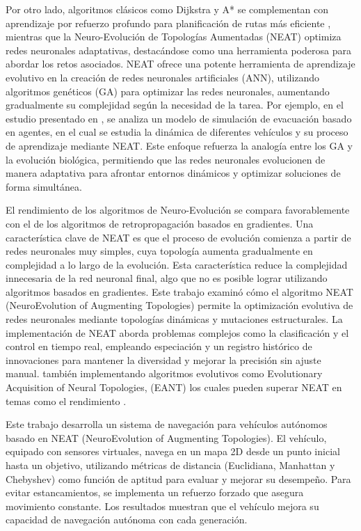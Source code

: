 \documentclass[conference]{IEEEtran}
\begin{document}
Por otro lado, algoritmos clásicos como Dijkstra y A* se complementan con aprendizaje por refuerzo profundo para planificación de rutas más eficiente \cite{Smart_Agent,Reinfor_Control,traffic_lights,A_dqn}, mientras que la Neuro-Evolución de Topologías Aumentadas (NEAT) optimiza redes neuronales adaptativas, destacándose como una herramienta poderosa para abordar los retos asociados. NEAT ofrece una potente herramienta de aprendizaje evolutivo en la creación de redes neuronales artificiales (ANN), utilizando algoritmos genéticos (GA) para optimizar las redes neuronales, aumentando gradualmente su complejidad según la necesidad de la tarea. Por ejemplo, en el estudio presentado en \cite{NEAT}, se analiza un modelo de simulación de evacuación basado en agentes, en el cual se estudia la dinámica de diferentes vehículos y su proceso de aprendizaje mediante NEAT. Este enfoque refuerza la analogía entre los GA y la evolución biológica, permitiendo que las redes neuronales evolucionen de manera adaptativa para afrontar entornos dinámicos y optimizar soluciones de forma simultánea.

El rendimiento de los algoritmos de Neuro-Evolución se compara favorablemente con el de los algoritmos de retropropagación basados en gradientes. Una característica clave de NEAT es que el proceso de evolución comienza a partir de redes neuronales muy simples, cuya topología aumenta gradualmente en complejidad a lo largo de la evolución\cite{NEAT_2}. Esta característica reduce la complejidad innecesaria de la red neuronal final, algo que no es posible lograr utilizando algoritmos basados en gradientes.
Este trabajo examinó cómo el algoritmo NEAT (NeuroEvolution of Augmenting Topologies) permite la optimización evolutiva de redes neuronales mediante topologías dinámicas y mutaciones estructurales. La implementación de NEAT aborda problemas complejos como la clasificación y el control en tiempo real, empleando especiación y un registro histórico de innovaciones para mantener la diversidad y mejorar la precisión sin ajuste manual. también implementando  algoritmos evolutivos como Evolutionary Acquisition of Neural Topologies, (EANT) los cuales pueden superar NEAT en temas  como el rendimiento \cite{NAT_R}.

Este trabajo desarrolla un sistema de navegación para vehículos autónomos basado en NEAT (NeuroEvolution of Augmenting Topologies). El vehículo, equipado con sensores virtuales, navega en un mapa 2D desde un punto inicial hasta un objetivo, utilizando métricas de distancia (Euclidiana, Manhattan y Chebyshev) como función de aptitud para evaluar y mejorar su desempeño. Para evitar estancamientos, se implementa un refuerzo forzado que asegura movimiento constante. Los resultados muestran que el vehículo mejora su capacidad de navegación autónoma con cada generación.
\end{document}
